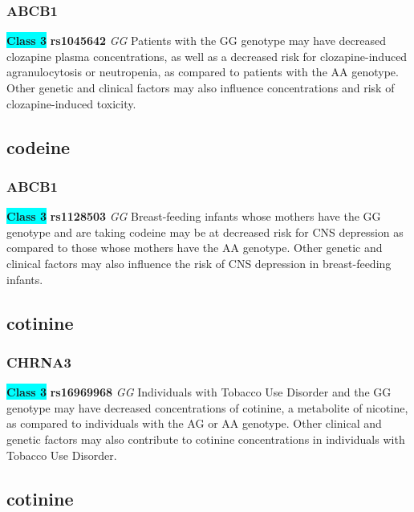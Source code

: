 \documentclass{book}
\begin{document}
\subsubsection{ ABCB1 }

\begin{center}
\textbf{\colorbox{cyan} {Class 3}} \textbf{ rs1045642 } \textit{ GG }
Patients with the GG genotype may have decreased clozapine plasma concentrations, as well as a decreased risk for clozapine-induced agranulocytosis or neutropenia, as compared to patients with the AA genotype. Other genetic and clinical factors may also influence concentrations and risk of clozapine-induced toxicity. 


\end{center}\subsection{ codeine }


\subsubsection{ ABCB1 }

\begin{center}
\textbf{\colorbox{cyan} {Class 3}} \textbf{ rs1128503 } \textit{ GG }
Breast-feeding infants whose mothers have the GG genotype and are taking codeine may be at decreased risk for CNS depression as compared to those whose mothers have the AA genotype. Other genetic and clinical factors may also influence the risk of CNS depression in breast-feeding infants. 


\end{center}\subsection{ cotinine }


\subsubsection{ CHRNA3 }

\begin{center}
\textbf{\colorbox{cyan} {Class 3}} \textbf{ rs16969968 } \textit{ GG }
Individuals with Tobacco Use Disorder and the GG genotype may have decreased concentrations of cotinine, a metabolite of nicotine, as compared to individuals with the AG or AA genotype. Other clinical and genetic factors may also contribute to cotinine concentrations in individuals with Tobacco Use Disorder.


\end{center}\subsection{ cotinine }
\end{document}
